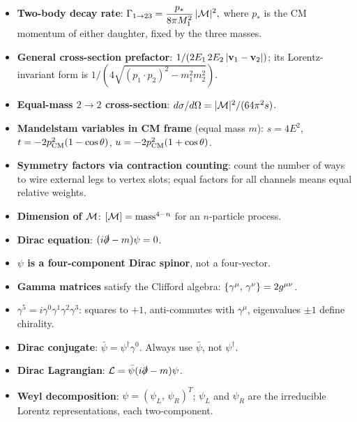 \documentclass[../main.tex]{subfiles}
\begin{document}
\begin{itemize}
  \item \textbf{Two-body decay rate}:
    $\displaystyle\Gamma_{1\to23} = \frac{p_*}{8\pi M_1^2}\,|\mathcal{M}|^2,$
    where $p_*$ is the CM momentum of either daughter, fixed by the three masses.

  \item \textbf{General cross-section prefactor}: $1/(2E_1\,2E_2\,|\mathbf{v}_1-\mathbf{v}_2|)$; its Lorentz-invariant form is $1/(4\sqrt{(p_1\cdot p_2)^2-m_1^2m_2^2})$.

  \item \textbf{Equal-mass $2\to2$ cross-section}: $d\sigma/d\Omega = |\mathcal{M}|^2/(64\pi^2 s)$.

  \item \textbf{Mandelstam variables in CM frame} (equal mass $m$): $s = 4E^2$, $t = -2p_{\rm CM}^2(1-\cos\theta)$, $u = -2p_{\rm CM}^2(1+\cos\theta)$.

  \item \textbf{Symmetry factors via contraction counting}: count the number of ways to wire external legs to vertex slots; equal factors for all channels means equal relative weights.

  \item \textbf{Dimension of $\mathcal{M}$}: $[\mathcal{M}] = {\rm mass}^{4-n}$ for an $n$-particle process.

  \item \textbf{Dirac equation}: $(i\slashed{\partial}-m)\psi = 0$.

  \item \textbf{$\psi$ is a four-component Dirac spinor}, not a four-vector.

  \item \textbf{Gamma matrices} satisfy the Clifford algebra: $\{\gamma^\mu,\, \gamma^\nu\} = 2g^{\mu\nu}$.

  \item \textbf{$\gamma^5 = i\gamma^0\gamma^1\gamma^2\gamma^3$}: squares to $+1$, anti-commutes with $\gamma^\mu$, eigenvalues $\pm1$ define chirality.

  \item \textbf{Dirac conjugate}: $\bar\psi = \psi^\dagger\gamma^0$.  Always use $\bar\psi$, not $\psi^\dagger$.

  \item \textbf{Dirac Lagrangian}: $\mathcal{L} = \bar\psi(i\slashed{\partial} - m)\psi$.

  \item \textbf{Weyl decomposition}: $\psi = (\psi_L,\,\psi_R)^T$; $\psi_L$ and $\psi_R$ are the irreducible Lorentz representations, each two-component.
\end{itemize}
\end{document}
